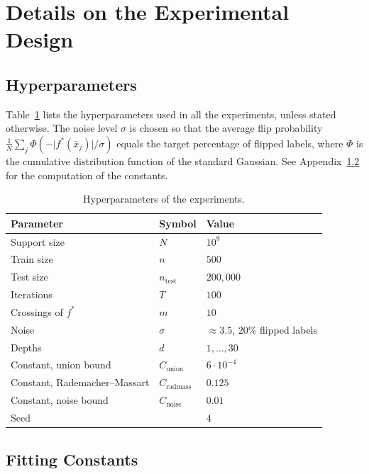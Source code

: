 \newpage
\section{Details on the Experimental Design}\label{app: code}

\subsection{Hyperparameters}\label{app: hyper}

Table~\ref{app/tab: hyperparameters} lists the hyperparameters used in all the experiments, unless stated otherwise. The noise level $\sigma$ is chosen so that the average flip probability $\frac{1}{N}\sum_{j}\Phi\left(-\vert f^*(\bar x_j)\vert/\sigma\right)$ equals the target percentage of flipped labels, where $\Phi$ is the cumulative distribution function of the standard Gaussian. See Appendix~\ref{app: constants} for the computation of the constants.

\begin{table}[h!]
\centering
\begin{tabular}{lll}
\toprule
Parameter & Symbol & Value \\
\midrule
Support size & $N$ & $10^9$ \\
Train size & $n$ & $500$ \\
Test size & $n_\text{test}$ & $200,000$ \\
Iterations & $T$ & $100$ \\
Crossings of $f^*$ & $m$ & $10$ \\
Noise & $\sigma$ & $\approx 3.5$, $20\%$ flipped labels \\
Depths & $d$ & $1,\ldots,30$ \\
Constant, union bound & $C_\text{union}$ & $6\cdot 10^{-4}$ \\
Constant, Rademacher--Massart & $C_\text{radmass}$ & $0.125$ \\
Constant, noise bound & $C_\text{noise}$ & $0.01$ \\
Seed & & $4$ \\
\bottomrule
\end{tabular}
\caption{Hyperparameters of the experiments.}\label{app/tab: hyperparameters}
\end{table}

\subsection{Fitting Constants}\label{app: constants}

